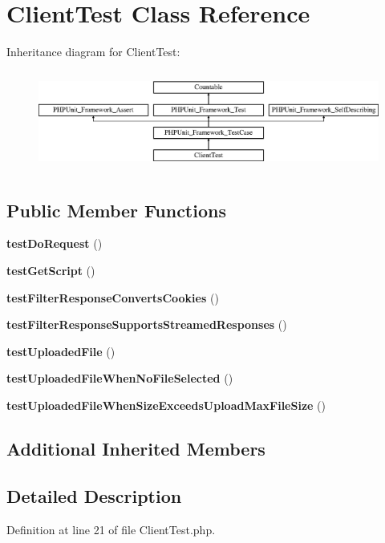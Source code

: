 \section{Client\+Test Class Reference}
\label{class_symfony_1_1_component_1_1_http_kernel_1_1_tests_1_1_client_test}
Inheritance diagram for Client\+Test\+:\begin{figure}[H]
\begin{center}
\leavevmode
\includegraphics[height=3.303835cm]{class_symfony_1_1_component_1_1_http_kernel_1_1_tests_1_1_client_test}
\end{center}
\end{figure}
\subsection*{Public Member Functions}
\begin{DoxyCompactItemize}
\item 
{\bf test\+Do\+Request} ()
\item 
{\bf test\+Get\+Script} ()
\item 
{\bf test\+Filter\+Response\+Converts\+Cookies} ()
\item 
{\bf test\+Filter\+Response\+Supports\+Streamed\+Responses} ()
\item 
{\bf test\+Uploaded\+File} ()
\item 
{\bf test\+Uploaded\+File\+When\+No\+File\+Selected} ()
\item 
{\bf test\+Uploaded\+File\+When\+Size\+Exceeds\+Upload\+Max\+File\+Size} ()
\end{DoxyCompactItemize}
\subsection*{Additional Inherited Members}


\subsection{Detailed Description}


Definition at line 21 of file Client\+Test.\+php.



